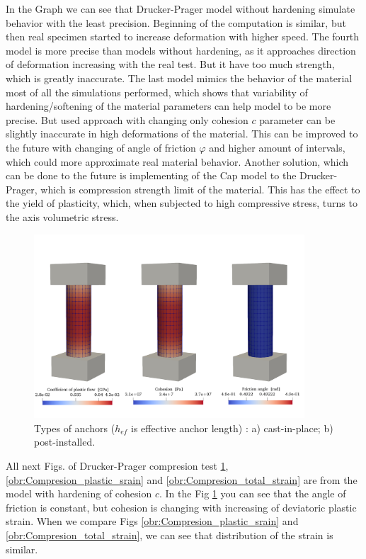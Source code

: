 In the Graph we can see that Drucker-Prager model without hardening simulate behavior with the least precision. Beginning of the computation is similar, but then real specimen started to increase deformation with higher speed. The fourth model is more precise than models without hardening, as it approaches direction of deformation increasing with the real test. But it have too much strength, which is greatly inaccurate. The last model mimics the behavior of the material most of all the simulations performed, which shows that variability of hardening/softening of the material parameters can help model to be more precise. But used approach with changing only cohesion $c$ parameter can be slightly inaccurate in high deformations of the material. This can be improved to the future with changing of angle of friction $\varphi$ and higher amount of intervals, which could more approximate real material behavior. Another solution, which can be done to the future is implementing of the Cap model to the Drucker-Prager, which is compression strength limit of the material. This has the effect to the yield of plasticity, which, when subjected to high compressive stress, turns to the axis volumetric stress. 



\begin{figure}[h!]
	\centering
	\includegraphics[width=0.9\textwidth]{obrazky/compression_zpevneni_parametry.png}
	\caption[Types of anchors]{Types of anchors ($h_{ef}$ is effective anchor length) \cite{anchors-ACI-318M}: a) cast-in-place; b) post-installed.}\label{obr:Compresion_parameters}
\end{figure}

All next Figs. of Drucker-Prager compresion test \ref{obr:Compresion_parameters}, \ref{obr:Compresion_plastic_srain} and \ref{obr:Compresion_total_strain} are from the model with hardening of cohesion $c$. In the Fig \ref{obr:Compresion_parameters} you can see that the angle of friction is constant, but cohesion is changing with increasing of deviatoric plastic strain. When we compare Figs \ref{obr:Compresion_plastic_srain} and \ref{obr:Compresion_total_strain}, we can see that distribution of the strain is similar.



